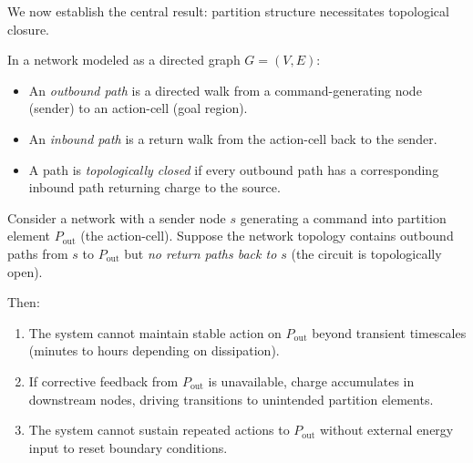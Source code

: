 We now establish the central result: partition structure necessitates topological closure.

\begin{definition}
\label{def:outbound-inbound}
In a network modeled as a directed graph $G=(V,E)$:
\begin{itemize}[noitemsep]
\item An \emph{outbound path} is a directed walk from a command-generating node (sender) to an action-cell (goal region).
\item An \emph{inbound path} is a return walk from the action-cell back to the sender.
\item A path is \emph{topologically closed} if every outbound path has a corresponding inbound path returning charge to the source.
\end{itemize}
\end{definition}

\begin{theorem}
\label{thm:closure-necessity}
Consider a network with a sender node $s$ generating a command into partition element $P_{\text{out}}$ (the action-cell). Suppose the network topology contains outbound paths from $s$ to $P_{\text{out}}$ but \emph{no return paths back to $s$} (the circuit is topologically open).

Then:
\begin{enumerate}[label=(\roman*), noitemsep]
\item The system cannot maintain stable action on $P_{\text{out}}$ beyond transient timescales (minutes to hours depending on dissipation).
\item If corrective feedback from $P_{\text{out}}$ is unavailable, charge accumulates in downstream nodes, driving transitions to unintended partition elements.
\item The system cannot sustain repeated actions to $P_{\text{out}}$ without external energy input to reset boundary conditions.
\end{enumerate}
\end{theorem}

